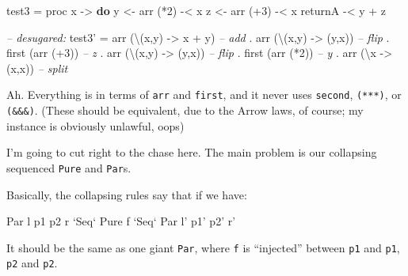 \documentclass[]{article}
\newenvironment{Shaded}{}{}
\newcommand{\CommentTok}[1]{\textcolor[rgb]{0.38,0.63,0.69}{\textit{#1}}}
\newcommand{\DataTypeTok}[1]{\textcolor[rgb]{0.56,0.13,0.00}{#1}}
\newcommand{\DecValTok}[1]{\textcolor[rgb]{0.25,0.63,0.44}{#1}}
\newcommand{\FunctionTok}[1]{\textcolor[rgb]{0.02,0.16,0.49}{#1}}
\newcommand{\KeywordTok}[1]{\textcolor[rgb]{0.00,0.44,0.13}{\textbf{#1}}}
\newcommand{\NormalTok}[1]{#1}
\newcommand{\OtherTok}[1]{\textcolor[rgb]{0.00,0.44,0.13}{#1}}
\begin{document}
\begin{Shaded}
\begin{Highlighting}[]
\NormalTok{test3 }\FunctionTok{=}\NormalTok{ proc x }\OtherTok{->} \KeywordTok{do}
\NormalTok{    y }\OtherTok{<-}\NormalTok{ arr (}\FunctionTok{*}\DecValTok{2}\NormalTok{) }\FunctionTok{-<}\NormalTok{ x}
\NormalTok{    z }\OtherTok{<-}\NormalTok{ arr (}\FunctionTok{+}\DecValTok{3}\NormalTok{) }\FunctionTok{-<}\NormalTok{ x}
\NormalTok{    returnA }\FunctionTok{-<}\NormalTok{ y }\FunctionTok{+}\NormalTok{ z}

\CommentTok{-- desugared:}
\NormalTok{test3' }\FunctionTok{=}\NormalTok{ arr (\textbackslash{}(x,y) }\OtherTok{->}\NormalTok{ x }\FunctionTok{+}\NormalTok{ y)     }\CommentTok{-- add}
       \FunctionTok{.}\NormalTok{ arr (\textbackslash{}(x,y) }\OtherTok{->}\NormalTok{ (y,x))     }\CommentTok{-- flip}
       \FunctionTok{.}\NormalTok{ first (arr (}\FunctionTok{+}\DecValTok{3}\NormalTok{))          }\CommentTok{-- z}
       \FunctionTok{.}\NormalTok{ arr (\textbackslash{}(x,y) }\OtherTok{->}\NormalTok{ (y,x))     }\CommentTok{-- flip}
       \FunctionTok{.}\NormalTok{ first (arr (}\FunctionTok{*}\DecValTok{2}\NormalTok{))          }\CommentTok{-- y}
       \FunctionTok{.}\NormalTok{ arr (\textbackslash{}x }\OtherTok{->}\NormalTok{ (x,x))         }\CommentTok{-- split}
\end{Highlighting}
\end{Shaded}

Ah. Everything is in terms of \texttt{arr} and \texttt{first}, and it never uses
\texttt{second}, \texttt{(***)}, or \texttt{(\&\&\&)}. (These should be
equivalent, due to the Arrow laws, of course; my instance is obviously unlawful,
oops)

I'm going to cut right to the chase here. The main problem is our collapsing
sequenced \texttt{Pure} and \texttt{Par}s.

Basically, the collapsing rules say that if we have:

\begin{Shaded}
\begin{Highlighting}[]
\DataTypeTok{Par}\NormalTok{ l p1 p2 r }\OtherTok{`Seq`} \DataTypeTok{Pure}\NormalTok{ f }\OtherTok{`Seq`} \DataTypeTok{Par}\NormalTok{ l' p1' p2' r'}
\end{Highlighting}
\end{Shaded}

It should be the same as one giant \texttt{Par}, where \texttt{f} is
``injected'' between \texttt{p1} and \texttt{p1\textquotesingle{}}, \texttt{p2}
and \texttt{p2\textquotesingle{}}.
\end{document}
